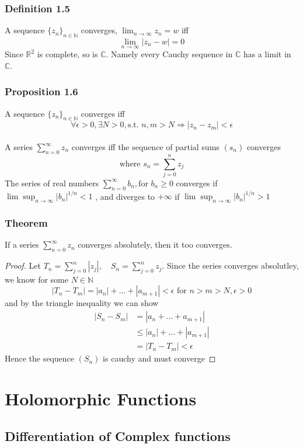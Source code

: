 \documentclass[a4paper, 12pt, twoside]{article}
\begin{document}
\subsubsection*{Definition 1.5}
A sequence $\{z_{n}\}_{n\in \mathbb{N}}$ converges, $\lim_{n\to \infty}z_{n}=w$ iff
$$\lim_{n\to \infty}|z_{n}-w|=0 $$
Since $\mathbb{R}^{2}$ is complete, so is $\mathbb{C}$. Namely every Cauchy sequence in $\mathbb{C}$ has a limit in $\mathbb{C}$.
\subsubsection*{Proposition 1.6}
A sequence $\{z_{n}\}_{n\in \mathbb{N}}$ converges iff
$$ \forall\epsilon>0,\exists N>0, \text{s.t. } n,m>N \Rightarrow |z_{n}-z_{m}|<\epsilon$$\\
\noindent
A series $ \sum_{n=0}^{\infty}z_{n}$ converges iff the sequence of partial sums $(s_{n})$ converges
$$\text{where } s_{n}=\sum_{j=0}^{n}z_{j}$$
\noindent
The series of real numbers $ \sum_{n=0}^{\infty}b_{n}, \text{for } b_{n}\geq 0$ converges if $\lim\sup_{n\to\infty}|b_{n}|^{1/n}<1$ , and diverges to $+\infty$ if $\lim\sup_{n\to\infty}|b_{n}|^{1/n}>1$
\subsubsection*{Theorem}
If a series $ \sum_{n=0}^{\infty}z_{n}$ converges absolutely, then it too converges.
\begin{proof}
    Let $T_{n}=\sum_{j=0}^{n}|z_{j}|,\quad S_{n}=\sum_{j=0}^{n}z_{j}$. Since the series converges absolutley, we know for some $N\in \mathbb{N}$
    $$|T_{n}-T_{m}|=|a_{n}|+\dots+|a_{m+1}|<\epsilon \text{ for }n>m>N, \epsilon>0$$
    and by the triangle inequality we can show
    \begin{align*}
        |S_{n}-S_{m}|&=|a_{n}+\dots+a_{m+1}|\\
        &\leq |a_{n}|+\dots+|a_{m+1}| \\
        &=|T_{n}-T_{m}|< \epsilon
    \end{align*}
    Hence the sequence $(S_{n})$ is cauchy and must converge
\end{proof}

\newpage
\section{Holomorphic Functions}
\subsection{Differentiation of Complex functions}
\end{document}
